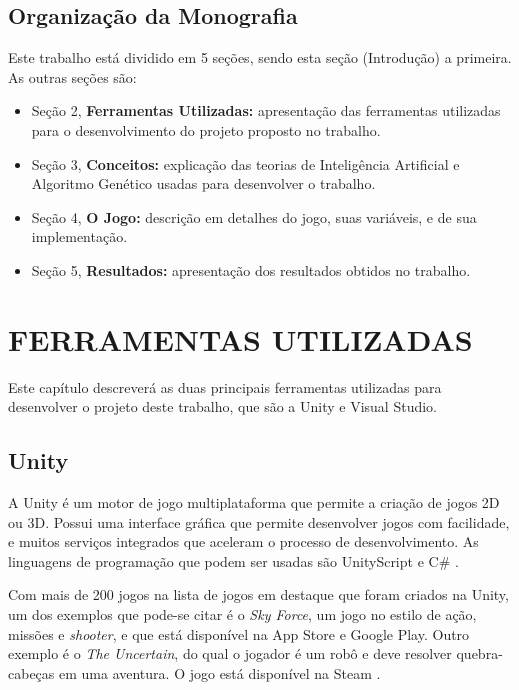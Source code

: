\documentclass[
	12pt,					%
	openright,				%
	oneside,				%
	a4paper,				%
	bibjustif,				%
	chapter=TITLE,			%
	english,				%
	brazil,					%
	]{abntex2}
\begin{document}
	\FloatBarrier
	\section{Organização da Monografia}
		Este trabalho está dividido em 5 seções, sendo esta seção (Introdução) a primeira. As outras seções são:
		\begin{itemize}[noitemsep]
     		\item Seção 2, \textbf{Ferramentas Utilizadas:} apresentação das ferramentas utilizadas para o desenvolvimento do projeto proposto no trabalho.
     		\item Seção 3, \textbf{Conceitos:} explicação das teorias de Inteligência Artificial e Algoritmo Genético usadas para desenvolver o trabalho.
     		\item Seção 4, \textbf{O Jogo:} descrição em detalhes do jogo, suas variáveis, e de sua implementação.
     		\item Seção 5, \textbf{Resultados:} apresentação dos resultados obtidos no trabalho.
  	 	\end{itemize}

\FloatBarrier
\newpage %
\chapter{FERRAMENTAS UTILIZADAS}

	Este capítulo descreverá as duas principais ferramentas utilizadas para desenvolver o projeto deste trabalho,
	que são a Unity e Visual Studio.

	\FloatBarrier
	\section{Unity}
		A Unity é um motor de jogo multiplataforma que permite a criação de jogos 2D ou 3D.
		Possui uma interface gráfica que permite desenvolver jogos com facilidade,
		e muitos serviços integrados que aceleram o processo de desenvolvimento.
		As linguagens de programação que podem ser usadas são UnityScript e C\#
		\cite{unitySite}.
		
		Com mais de 200 jogos na lista de jogos em destaque que foram criados na Unity,
		um dos exemplos que pode-se citar é o \textit{Sky Force},
		um jogo no estilo de ação, missões e \textit{shooter},
		e que está disponível na App Store e Google Play.
		Outro exemplo é o \textit{The Uncertain},
		do qual o jogador é um robô e
		deve resolver quebra-cabeças em uma aventura.
		O jogo está disponível na Steam
		\cite{unityGames}.
		
\end{document}
